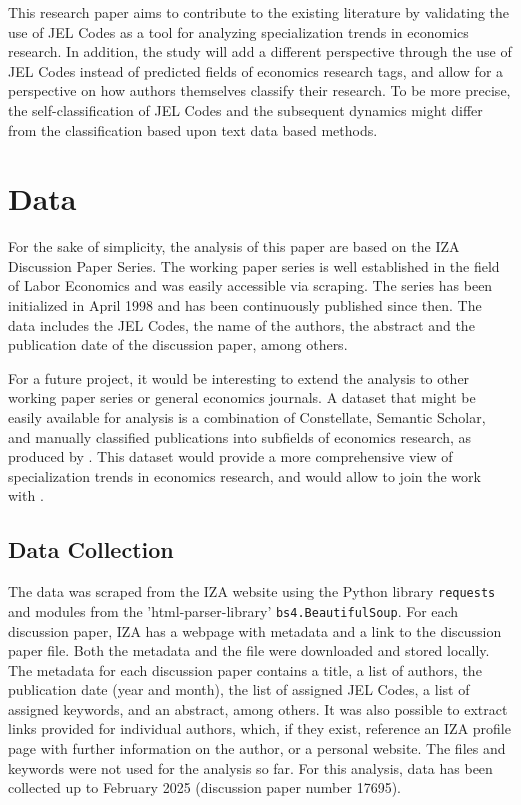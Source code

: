 \documentclass[11pt, a4paper, leqno]{article}
\begin{document}
This research paper aims to contribute to the existing literature by validating the use of JEL Codes as a tool for analyzing specialization trends in economics research.
In addition, the study will add a different perspective through the use of JEL Codes instead of predicted fields of economics research tags, and allow for a perspective on how authors themselves classify their research.
To be more precise, the self-classification of JEL Codes and the subsequent dynamics might differ from the classification based upon text data based methods.

\section{Data}
For the sake of simplicity, the analysis of this paper are based on the IZA Discussion Paper Series.
The working paper series is well established in the field of Labor Economics and was easily accessible via scraping.
The series has been initialized in April 1998 and has been continuously published since then.
The data includes the JEL Codes, the name of the authors, the abstract and the publication date of the discussion paper, among others.

For a future project, it would be interesting to extend the analysis to other working paper series or general economics journals.
A dataset that might be easily available for analysis is a combination of Constellate, Semantic Scholar, and manually classified publications into subfields of economics research, as produced by \citet{galiani2023a}.
This dataset would provide a more comprehensive view of specialization trends in economics research, and would allow to join the work with .

\subsection{Data Collection}
The data was scraped from the IZA website using the Python library \texttt{requests} and modules from the 'html-parser-library' \texttt{bs4.BeautifulSoup}.
For each discussion paper, IZA has a webpage with metadata and a link to the discussion paper file.
Both the metadata and the file were downloaded and stored locally.
The metadata for each discussion paper contains a title, a list of authors, the publication date (year and month), the list of assigned JEL Codes, a list of assigned keywords, and an abstract, among others.
It was also possible to extract links provided for individual authors, which, if they exist, reference an IZA profile page with further information on the author, or a personal website.
The files and keywords were not used for the analysis so far.
For this analysis, data has been collected up to February 2025 (discussion paper number 17695).
\end{document}
